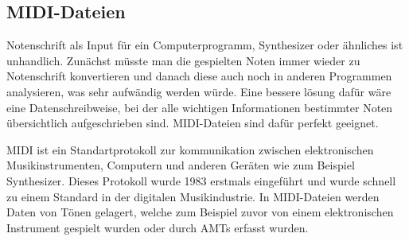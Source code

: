 \subsection{MIDI-Dateien}
Notenschrift als Input für ein Computerprogramm, Synthesizer oder ähnliches ist unhandlich.
Zunächst müsste man die gespielten Noten immer wieder zu Notenschrift konvertieren
und danach diese auch noch in anderen Programmen analysieren, was sehr aufwändig werden würde.
Eine bessere lösung dafür wäre eine Datenschreibweise,
bei der alle wichtigen Informationen bestimmter Noten übersichtlich aufgeschrieben sind.
MIDI-Dateien sind dafür perfekt geeignet.

MIDI ist ein Standartprotokoll zur kommunikation zwischen
elektronischen Musikinstrumenten, Computern und anderen Geräten wie zum Beispiel Synthesizer.
Dieses Protokoll wurde 1983 erstmals eingeführt und wurde schnell zu einem Standard in der digitalen Musikindustrie.
\cite{smith1983midi}
In MIDI-Dateien werden Daten von Tönen gelagert,
welche zum Beispiel zuvor von einem elektronischen Instrument gespielt wurden oder durch AMTs erfasst wurden.

